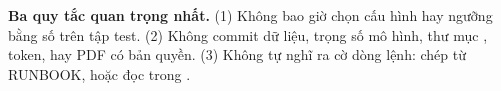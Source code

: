 \begin{warnbox}
\textbf{Ba quy tắc quan trọng nhất.} (1) Không bao giờ chọn cấu hình hay ngưỡng bằng số trên tập test.
(2) Không commit dữ liệu, trọng số mô hình, thư mục , token, hay PDF có bản quyền.
(3) Không tự nghĩ ra cờ dòng lệnh: chép từ RUNBOOK, hoặc đọc  trong .
\end{warnbox}
